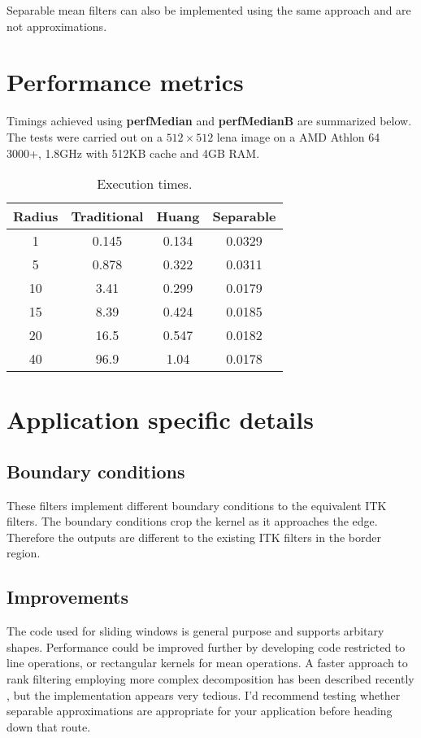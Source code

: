 \documentclass{InsightArticle}
\begin{document}
Separable mean filters can also be implemented using the same approach
and are not approximations.
\section{Performance metrics}
Timings achieved using {\bf perfMedian} and {\bf perfMedianB} are
summarized below. The tests were carried out on a $512 \times 512$
lena image on a AMD Athlon 64 3000+, 1.8GHz with 512KB cache and 4GB RAM.

\begin{table}[htbp]
\centering
\begin{tabular}{|c|c|c|c|}
\hline
Radius & Traditional & Huang & Separable \\
\hline
\hline
1    &   0.145 &  0.134 &  0.0329 \\
5    &   0.878 &  0.322 &  0.0311 \\
10   &   3.41  &  0.299 &  0.0179 \\
15   &   8.39  &  0.424 &  0.0185 \\
20   &   16.5  &  0.547 &  0.0182 \\
40   &   96.9  &  1.04  &  0.0178 \\
\hline
\end{tabular}
\caption{Execution times. \label{tbl:perf}}
\end{table}

\section{Application specific details}
\subsection{Boundary conditions}
These filters implement different boundary conditions to the
equivalent ITK filters. The boundary conditions crop the kernel as it
approaches the edge. Therefore the outputs are different to the
existing ITK filters in the border region.

\subsection{Improvements}
The code used for sliding windows is general purpose and supports
arbitary shapes. Performance could be improved further by developing
code restricted to line operations, or rectangular kernels for mean
operations. A faster approach to rank filtering employing more complex
decomposition has been described recently \cite{Weiss}, but the
implementation appears very tedious. I'd recommend testing whether
separable approximations are appropriate for your application before
heading down that route.

\appendix





\nocite{ITKSoftwareGuide}
\end{document}
